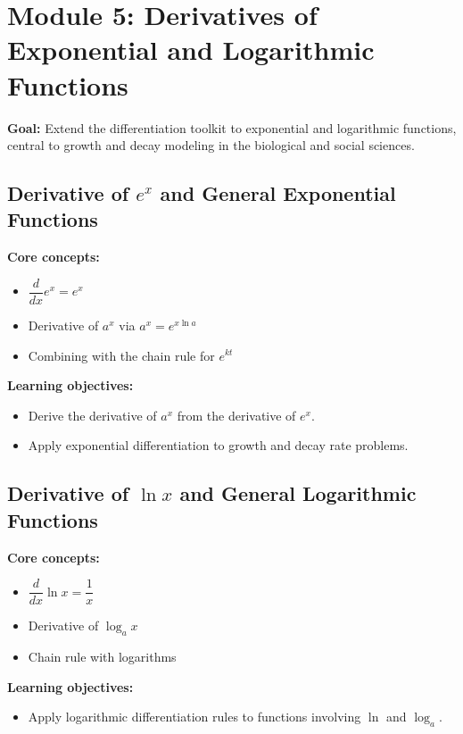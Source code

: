 \documentclass{article}
\begin{document}
\section{Module 5: Derivatives of Exponential and Logarithmic Functions}
\textbf{Goal:} Extend the differentiation toolkit to exponential and logarithmic functions, central to growth and decay modeling in the biological and social sciences.

\subsection{Derivative of $e^x$ and General Exponential Functions}
\textbf{Core concepts:}
\begin{itemize}[leftmargin=*]
  \item $\dfrac{d}{dx}e^x = e^x$
  \item Derivative of $a^x$ via $a^x = e^{x\ln a}$
  \item Combining with the chain rule for $e^{kt}$
\end{itemize}
\textbf{Learning objectives:}
\begin{itemize}[leftmargin=*]
  \item Derive the derivative of $a^x$ from the derivative of $e^x$.
  \item Apply exponential differentiation to growth and decay rate problems.
\end{itemize}

\subsection{Derivative of $\ln x$ and General Logarithmic Functions}
\textbf{Core concepts:}
\begin{itemize}[leftmargin=*]
  \item $\dfrac{d}{dx}\ln x = \dfrac{1}{x}$
  \item Derivative of $\log_a x$
  \item Chain rule with logarithms
\end{itemize}
\textbf{Learning objectives:}
\begin{itemize}[leftmargin=*]
  \item Apply logarithmic differentiation rules to functions involving $\ln$ and $\log_a$.
\end{itemize}
\end{document}
